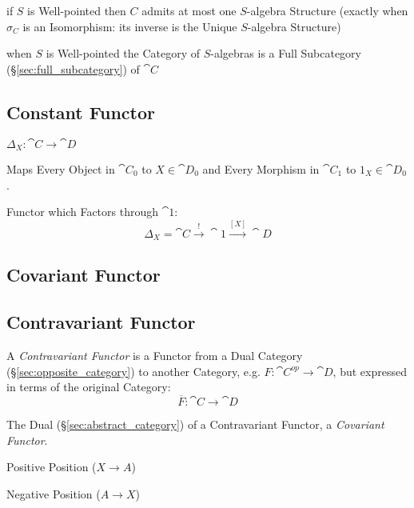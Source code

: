 if $S$ is Well-pointed then $C$ admits at most one $S$-algebra
Structure (exactly when $\sigma_C$ is an Isomorphism: its inverse is
the Unique $S$-algebra Structure)

when $S$ is Well-pointed the Category of $S$-algebras is a Full
Subcategory (\S\ref{sec:full_subcategory}) of $\cat{C}$



\subsection{Constant Functor}\label{sec:constant_functor}

$\Delta_X : \cat{C} \rightarrow \cat{D}$

Maps Every Object in $\cat{C}_0$ to $X \in \cat{D}_0$ and Every
Morphism in $\cat{C}_1$ to $1_X \in \cat{D}_0$.

Functor which Factors through $\cat{1}$:
\[
  \Delta_X = \cat{C} \xrightarrow{\;\;!\;\;} \cat{1}
    \xrightarrow{[X]} \cat{D}
\]



\subsection{Covariant Functor} \label{sec:covariant_functor}

\subsection{Contravariant Functor} \label{sec:contravariant_functor}

A \emph{Contravariant Functor} is a Functor from a Dual Category
(\S\ref{sec:opposite_category}) to another Category, e.g. $F :
\cat{C^{op}} \rightarrow \cat{D}$, but expressed in terms of the
original Category:
\[
  \overline{F} : \cat{C} \rightarrow \cat{D}
\]

The Dual (\S\ref{sec:abstract_category}) of a Contravariant
Functor, a \emph{Covariant Functor}.

Positive Position ($X \rightarrow A$)

Negative Position ($A \rightarrow X$)



